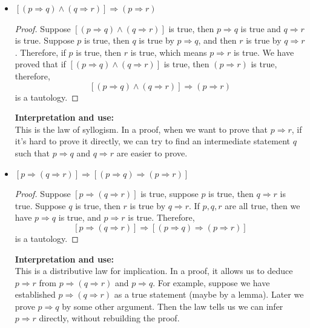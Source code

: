 \begin{solutions*}
    \fixlistskip
    \begin{itemize}
        \item $[(p \Rightarrow q) \wedge (q \Rightarrow r)] \Rightarrow (p \Rightarrow r)$
        \begin{proof}
            Suppose $[(p \Rightarrow q) \wedge (q \Rightarrow r)]$ is true, then $p \Rightarrow q$ is true and $q \Rightarrow r$ is true. Suppose $p$ is true, then $q$ is true by $p \Rightarrow q$, and then $r$ is true by $q \Rightarrow r$. Therefore, if $p$ is true, then $r$ is true, which means $p \Rightarrow r$ is true. We have proved that if $[(p \Rightarrow q) \wedge (q \Rightarrow r)]$ is true, then $(p \Rightarrow r)$ is true, therefore,
            \[[(p \Rightarrow q) \wedge (q \Rightarrow r)] \Rightarrow (p \Rightarrow r)\]
             is a tautology.
        \end{proof}

        \textbf{Interpretation and use: }\\
        This is the law of syllogism. In a proof, when we want to prove that $p \Rightarrow r$, if it's hard to prove it directly, we can try to find an intermediate statement $q$ such that $p \Rightarrow q$ and $q \Rightarrow r$ are easier to prove.
        
        \item $[p \Rightarrow (q \Rightarrow r)] \Rightarrow [(p \Rightarrow q) \Rightarrow (p \Rightarrow r)]$
        \begin{proof}
            Suppose $[p \Rightarrow (q \Rightarrow r)]$ is true, suppose $p$ is true, then $q \Rightarrow r$ is true. Suppose $q$ is true, then $r$ is true by $q \Rightarrow r$. If $p,q,r$ are all true, then we have $p \Rightarrow q$ is true, and $p \Rightarrow r$ is true. Therefore, 
            \[[p \Rightarrow (q \Rightarrow r)] \Rightarrow [(p \Rightarrow q) \Rightarrow (p \Rightarrow r)]\]
            is a tautology.
        \end{proof}

        \textbf{Interpretation and use: }\\
        This is a distributive law for implication. In a proof, it allows us to deduce $p \Rightarrow r$ from $p \Rightarrow (q \Rightarrow r)$ and $p \Rightarrow q$. For example, suppose we have established $p \Rightarrow (q \Rightarrow r)$ as a true statement (maybe by a lemma). Later we prove $p \Rightarrow q$ by some other argument. Then the law tells us we can infer $p \Rightarrow r$ directly, without rebuilding the proof.


\end{itemize}
\end{solutions*}
